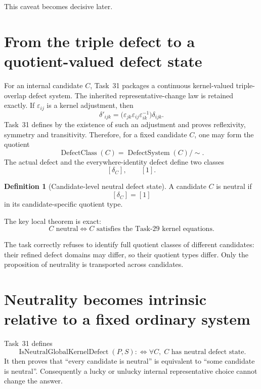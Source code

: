 \documentclass[11pt,a4paper]{article}
\theoremstyle{definition}
\newtheorem{definition}{Definition}
\newcommand{\code}[1]{\path{#1}}
\begin{document}
This caveat becomes decisive later.

\section{From the triple defect to a quotient-valued defect state}\label{sec:defectstate}

For an internal candidate $C$, Task~31 packages a continuous kernel-valued triple-overlap defect system.  The inherited representative-change law is retained exactly.  If $\varepsilon_{ij}$ is a kernel adjustment, then
\begin{equation}\label{eq:adjshift}
 \delta'_{ijk}
 =\bigl(\varepsilon_{jk}\varepsilon_{ij}\varepsilon_{ik}^{-1}\bigr)\delta_{ijk}.
\end{equation}
Task~31 defines \code{DefectEquivalent} by the existence of such an adjustment and proves reflexivity, symmetry and transitivity.  Therefore, for a fixed candidate $C$, one may form the quotient
\[
 \operatorname{DefectClass}(C)
 = \operatorname{DefectSystem}(C)/{\sim}.
\]
The actual defect and the everywhere-identity defect define two classes
\[
 [\delta_C],\qquad[1].
\]

\begin{definition}[Candidate-level neutral defect state]
A candidate $C$ is neutral if
\[
 [\delta_C]=[1]
\]
in its candidate-specific quotient type.
\end{definition}

The key local theorem is exact:
\begin{equation}\label{eq:candidate-neutral}
 C\text{ neutral}
 \iff
 C\text{ satisfies the Task-29 kernel equations}.
\end{equation}

The task correctly refuses to identify full quotient classes of different candidates: their refined defect domains may differ, so their quotient types differ.  Only the proposition of neutrality is transported across candidates.

\section{Neutrality becomes intrinsic relative to a fixed ordinary system}\label{sec:neutrality}

Task~31 defines
\begin{equation}\label{eq:globalneutral}
 \operatorname{IsNeutralGlobalKernelDefect}(P,S)
 :\Longleftrightarrow
 \forall C,\; C\text{ has neutral defect state}.
\end{equation}
It then proves that ``every candidate is neutral'' is equivalent to ``some candidate is neutral''.  Consequently a lucky or unlucky internal representative choice cannot change the answer.
\end{document}
